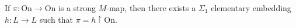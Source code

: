 If $\pi: \text{On} \rightarrow \text{On}$ is a strong $M$-map, then there exists a $\Sigma_1$ elementary embedding $h: L \rightarrow L$ such that $\pi = h \upharpoonright \text{On}$.
